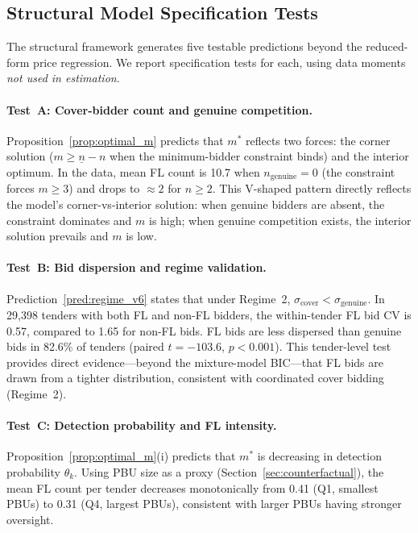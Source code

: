 
\subsection{Structural Model Specification Tests} %
\label{sec:spec_tests}

The structural framework generates five testable predictions beyond
the reduced-form price regression. We report specification tests
for each, using data moments \emph{not used in estimation}.

\paragraph{Test~A: Cover-bidder count and genuine competition.}
Proposition~\ref{prop:optimal_m} predicts that $m^*$ reflects two
forces: the corner solution ($m \geq \underline{n} - n$ when the
minimum-bidder constraint binds) and the interior optimum. In the
data, mean FL count is 10.7 when $n_{\text{genuine}} = 0$ (the
constraint forces $m \geq 3$) and drops to $\approx 2$ for
$n \geq 2$. This V-shaped pattern directly reflects the model's
corner-vs-interior solution: when genuine bidders are absent, the
constraint dominates and $m$ is high; when genuine competition
exists, the interior solution prevails and $m$ is low.

\paragraph{Test~B: Bid dispersion and regime validation.}
Prediction~\ref{pred:regime_v6} states that under Regime~2,
$\sigma_{\text{cover}} < \sigma_{\text{genuine}}$. In 29,398 tenders
with both FL and non-FL bidders, the within-tender FL bid CV is 0.57,
compared to 1.65 for non-FL bids. FL bids are less dispersed than
genuine bids in 82.6\% of tenders (paired $t = -103.6$,
$p < 0.001$). This tender-level test provides direct
evidence---beyond the mixture-model BIC---that FL bids are
drawn from a tighter distribution, consistent with coordinated
cover bidding (Regime~2).

\paragraph{Test~C: Detection probability and FL intensity.}
Proposition~\ref{prop:optimal_m}(i) predicts that $m^*$ is decreasing
in detection probability $\theta_k$. Using PBU size as a proxy
(Section~\ref{sec:counterfactual}), the mean FL count per tender
decreases monotonically from 0.41 (Q1, smallest PBUs) to 0.31 (Q4,
largest PBUs), consistent with larger PBUs having stronger oversight.

